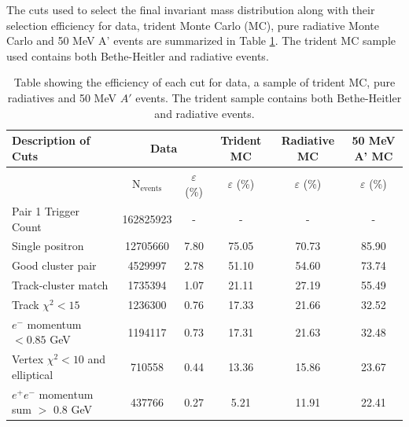 The cuts used to select the final invariant mass distribution along with their
selection efficiency for data, trident Monte Carlo (MC), pure radiative 
Monte Carlo and 50 MeV A' events are summarized in Table \ref{tab:sel_eff}.
The trident MC sample used contains both Bethe-Heitler and radiative events.

\begin{table}
    \centering
    \begin{tabular}{l||c|c|c|c|c}
        \toprule
        \textbf{Description of Cuts} 
        & \multicolumn{2}{c|}{\textbf{Data}}
        & \textbf{Trident MC}
        & \textbf{Radiative MC}
        & \textbf{50 MeV A' MC} \\
        \midrule
        \midrule
        & N$_{\text{events}}$ & $\varepsilon$ (\%)
        & $\varepsilon$ (\%) 
        & $\varepsilon$ (\%)
        & $\varepsilon$ (\%) \\ 
        \midrule
        \midrule
        Pair 1 Trigger Count & 162825923 & -  & - & - & - \\
        Single positron & 12705660 & 7.80  & 75.05 & 70.73 & 85.90 \\
        Good cluster pair & 4529997 & 2.78  & 51.10 & 54.60 & 73.74 \\
        Track-cluster match & 1735394 & 1.07  & 21.11 & 27.19 &55.49 \\
        Track $\chi^2 < 15$ &1236300  & 0.76  &17.33  & 21.66 &32.52  \\
        $e^-$ momentum $ < 0.85$ GeV & 1194117 & 0.73  & 17.31 & 21.63 &32.48  \\
        Vertex $\chi^2 < 10$ and elliptical &710558  & 0.44  &13.36  & 15.86& 23.67 \\
        $e^+e^-$ momentum sum $>$ 0.8 GeV & 437766 & 0.27   & 5.21 & 11.91 &22.41  \\
        \bottomrule
    \end{tabular}
    \caption{Table showing the efficiency of each cut for data, a sample of 
             trident MC, pure radiatives and 50 MeV $A'$ events.  The trident sample
             contains both Bethe-Heitler and radiative events.}
    \label{tab:sel_eff}
\end{table}

